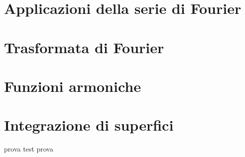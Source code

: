 \documentclass[a4paper, 11pt]{report}
\begin{document}

\chapter{Applicazioni della serie di Fourier}


\chapter{Trasformata di Fourier}


\chapter{Funzioni armoniche}


\chapter{Integrazione di superfici}


\newpage

prova test prova 
\end{document}
